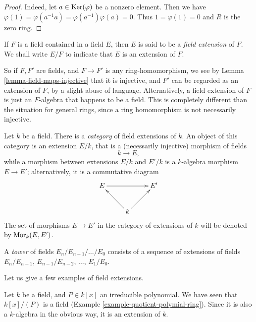 \begin{proof}
Indeed, let $a \in \mathop{\mathrm{Ker}}(\varphi)$ be a nonzero element. Then we have
$\varphi(1) = \varphi(a^{-1} a) = \varphi(a^{-1}) \varphi(a) = 0$.
Thus $1 = \varphi(1) = 0$ and $R$ is the zero ring.
\end{proof}

\begin{definition}
\label{definition-extension}
If $F$ is a field contained in a field $E$, then $E$ is said
to be a {\it field extension} of $F$. We shall write $E/F$ to indicate
that $E$ is an extension of $F$.
\end{definition}

\noindent
So if $F, F'$ are fields, and $F \to F'$ is any ring-homomorphism, we see by
Lemma \ref{lemma-field-maps-injective} that it is injective, and $F'$ can be
regarded as an extension of $F$, by a slight abuse of language. Alternatively,
a field extension of $F$ is just an $F$-algebra that happens to be a field.
This is completely different than the situation for general rings, since a
ring homomorphism is not necessarily injective.

\medskip\noindent
Let $k$ be a field. There is a {\it category} of field extensions of $k$.
An object of this category is an extension $E/k$, that is a
(necessarily injective) morphism of fields
$$
k \to E,
$$
while a morphism between extensions $E/k$ and $E'/k$ is a $k$-algebra
morphism $E \to E'$; alternatively, it is a commutative diagram
$$
\xymatrix{
E \ar[rr] & & E' \\
& k \ar[ru] \ar[lu] &
}
$$
The set of morphisms $E \to E'$ in the category of extensions of $k$
will be denoted by $\mathop{\mathrm{Mor}}\nolimits_k(E, E')$.

\begin{definition}
\label{definition-tower}
A {\it tower} of fields $E_n/E_{n - 1}/\ldots/E_0$ consists of a sequence of
extensions of fields
$E_n/E_{n - 1}$, $E_{n - 1}/E_{n - 2}$, $\ldots$, $E_1/E_0$.
\end{definition}

\noindent
Let us give a few examples of field extensions.

\begin{example}
\label{example-monogenic-extension}
Let $k$ be a field, and $P \in k[x]$ an irreducible polynomial. We have
seen that $k[x]/(P)$ is a field (Example \ref{example-quotient-polymial-ring}).
Since it is also a $k$-algebra in the obvious way, it is an extension of $k$.
\end{example}

